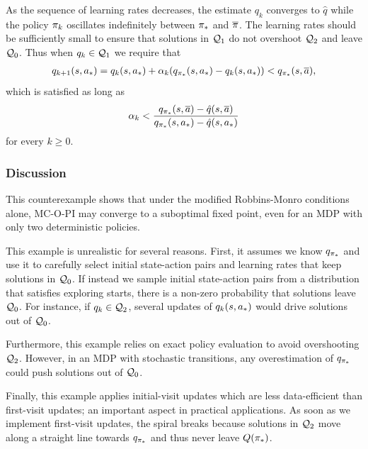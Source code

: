 As the sequence of learning rates decreases, the estimate $q_k$ converges to $\hat{q}$ while the policy $\pi_k$ oscillates indefinitely between ${\pi}_*$ and $\overline{\pi}$.
The learning rates should be sufficiently small to ensure that solutions in $\mathcal{Q}_1$ do not overshoot $\mathcal{Q}_2$ and leave $\mathcal{Q}_0$. Thus when $q_{k} \in \mathcal{Q}_1$ we require that
\begin{align*}
    q_{{k+1}}(s, {a}_*) = q_k(s, {a}_*) + \alpha_k (q_{{\pi}_*}(s, {a}_*) - q_k(s, {a}_*)) < q_{{\pi}_*}(s, \overline{a}) ,
\end{align*}
which is satisfied as long as
\begin{align*}
    \alpha_k
    < \dfrac{q_{{\pi}_*}(s, \overline{a}) - \hat{q}(s, \overline{a})}{q_{{\pi}_*}(s, {a}_*) - \hat{q}(s, {a}_*)}
\end{align*}
for every $k \geq 0$.


\subsubsection{Discussion}


This counterexample shows that under the modified Robbins-Monro conditions alone, MC-O-PI may converge to a suboptimal fixed point, even for an MDP with only two deterministic policies.

This example is unrealistic for several reasons. First, it assumes we know $q_{{\pi}_*}$ and use it to carefully select initial state-action pairs and learning rates that keep solutions in $\mathcal{Q}_0$.
If instead we sample initial state-action pairs from a distribution that satisfies exploring starts, there is a non-zero probability that solutions leave $\mathcal{Q}_0$. For instance, if $q_k \in \mathcal{Q}_2$, several updates of $q_k(s, {a}_*)$ would drive solutions out of $\mathcal{Q}_0$.

Furthermore, this example relies on exact policy evaluation to avoid overshooting $\mathcal{Q}_2$. However, in an MDP with stochastic transitions, any overestimation of $q_{{\pi}_*}$ could push solutions out of $\mathcal{Q}_0$.

Finally, this example applies initial-visit updates which are less data-efficient than first-visit updates; an important aspect in practical applications. 
As soon as we implement first-visit updates, the spiral breaks because solutions in $\mathcal{Q}_2$ move along a straight line towards $q_{{\pi}_*}$ and thus never leave $Q({\pi}_*)$.

